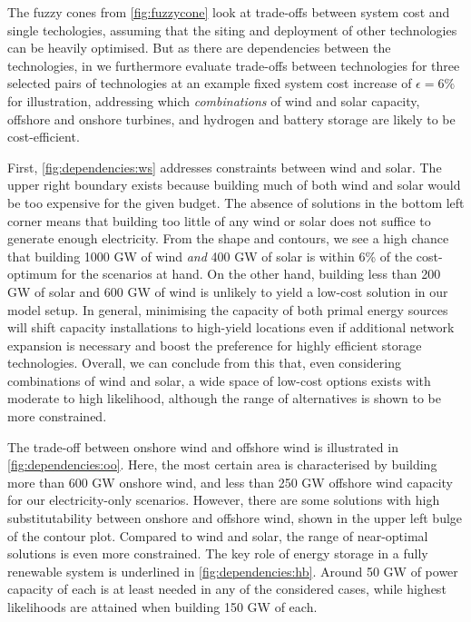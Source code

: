 The fuzzy cones from \cref{fig:fuzzycone} look at trade-offs between system cost
and single techologies, assuming that the siting and deployment of other
technologies can be heavily optimised. But as there are dependencies between the
technologies, in  we
furthermore evaluate trade-offs between technologies for three selected pairs of technologies at
an example fixed system cost increase of $\epsilon=6\%$ for illustration, addressing which
\textit{combinations} of wind and solar capacity, offshore and onshore turbines,
and hydrogen and battery storage are likely to be cost-efficient.

First, \cref{fig:dependencies:ws} addresses constraints between wind and solar.
The upper right boundary exists because building much of both wind and solar
would be too expensive for the given budget. The absence of solutions in the
bottom left corner means that building too little of any wind or solar does not
suffice to generate enough electricity. From the shape and contours, we see a
high chance that building 1000 GW of wind \textit{and} 400 GW of solar is within
6\% of the cost-optimum for the scenarios at hand. On the other hand, building
less than 200 GW of solar and 600 GW of wind is unlikely to yield a low-cost
solution in our model setup. In general, minimising the capacity of both primal
energy sources will shift capacity installations to high-yield locations even if
additional network expansion is necessary and boost the preference for highly
efficient storage technologies. Overall, we can conclude from this that, even
considering combinations of wind and solar, a wide space of low-cost options
exists with moderate to high likelihood, although the range of alternatives is
shown to be more constrained.

The trade-off between onshore wind and offshore wind is illustrated in
\cref{fig:dependencies:oo}. Here, the most certain area is characterised by
building more than 600 GW onshore wind, and less than 250 GW offshore wind
capacity for our electricity-only scenarios. However, there are some solutions
with high substitutability between onshore and offshore wind, shown in the upper
left bulge of the contour plot. Compared to wind and solar, the range of
near-optimal solutions is even more constrained. The key role of energy storage
in a fully renewable system is underlined in \cref{fig:dependencies:hb}. Around
50 GW of power capacity of each is at least needed in any of the considered
cases, while highest likelihoods are attained when building 150 GW of each.

